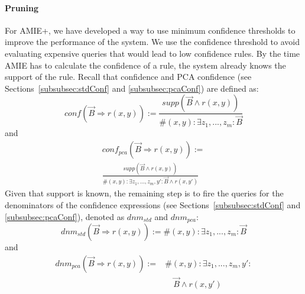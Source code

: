 {\paragraph{Pruning} 
For AMIE+, we have developed a way to use minimum confidence thresholds to improve the performance of the system.  
We use the confidence threshold to avoid evaluating expensive queries that would lead to low confidence rules.
By the time AMIE has to calculate the confidence of a rule, the system already knows the support of the rule.
Recall that confidence and PCA confidence (see Sections~\ref{subsubsec:stdConf} and \ref{subsubsec:pcaConf}) are defined as:
\[conf(\vec{B} \Rightarrow r(x,y)) := \frac{supp(\vec{B} \wedge r(x,y))}{\#(x,y): \exists z_1,...,z_m: \vec{B}}\]
and
\begin{multline*}
conf_{pca}(\vec{B} \Rightarrow r(x,y)) :=\\
\frac{supp(\vec{B} \wedge r(x,y))}{\#(x,y): \exists z_1,...,z_m,y': \vec{B} \wedge r(x,y')}
\end{multline*}
\noindent Given that support is known, the remaining step is to fire the queries for the denominators of the confidence expressions
(see Sections~\ref{subsubsec:stdConf} and \ref{subsubsec:pcaConf}), denoted as $dnm_{std}$ and $dnm_{pca}$:
\begin{equation} \label{eq:denomStandardConf}
 dnm_{std}(\vec{B} \Rightarrow r(x,y)):= \#(x,y): \exists z_1,...,z_m: \vec{B}
\end{equation}
and
\begin{equation} \label{eq:denomPCA}
\begin{array}{rl}
dnm_{pca}(\vec{B} \Rightarrow r(x,y)) := {}& \#(x,y): \exists z_1,...,z_m,y': \\ &\quad \vec{B} \wedge r(x,y')
\end{array}
\end{equation}

}

